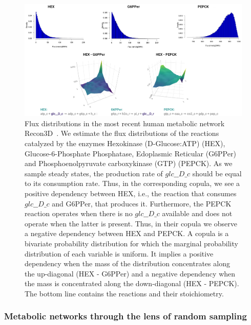    \begin{figure}[h]
      \centering
      \includegraphics[width=125mm]{figures/copulas_cropped.png}
      \caption[Flux distributions in the most recent human metabolic network Recon3D]{
         Flux distributions in the most recent human metabolic network Recon3D~\citep{brunk2018recon3d}. 
         We estimate the flux distributions of the reactions catalyzed by the enzymes Hexokinase (D-Glucose:ATP) (HEX), Glucose-6-Phosphate Phosphatase, Edoplasmic Reticular (G6PPer)
         and Phosphoenolpyruvate carboxykinase (GTP) (PEPCK).
         As we sample steady states, the production rate of $glc\_\_D \_c$ should be equal to its consumption rate. 
         Thus, in the corresponding copula, we see a positive dependency between HEX,
         i.e., the reaction that consumes $glc\_\_D \_c$ and G6PPer, that produces it.
         Furthermore, the PEPCK reaction operates when there is no $glc\_\_D\_c$ available and does not operate when the latter is present.
         Thus, in their copula we observe a negative dependency between HEX and PEPCK.
         A copula is a bivariate probability distribution for which the marginal probability distribution of each variable is uniform.
         It implies a positive dependency when the mass of the distribution concentrates along the up-diagonal (HEX - G6PPer)
         and a negative dependency when the mass is concentrated along the down-diagonal (HEX - PEPCK). %
         The bottom line contains the  reactions and their stoichiometry.
      }
      \label{fig:copulas}
   \end{figure}


   \subsubsection*{Metabolic networks through the lens of random sampling} 
   \label{subsec:previous_work}

